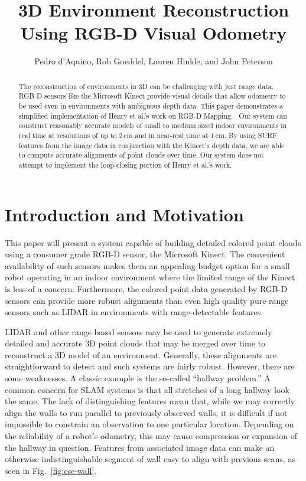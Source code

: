 \documentclass[letterpaper, 10pt, conference]{ieeeconf}
\title{\LARGE \bf
    3D Environment Reconstruction Using RGB-D Visual Odometry
}
\author{Pedro d'Aquino, Rob Goeddel, Lauren Hinkle, and John Peterson}
\begin{document}
\maketitle

\begin{abstract}
The reconstruction of environments in 3D can be challenging with just range
data. RGB-D sensors like the Microsoft Kinect provide visual details that
allow odometry to be used even in environments with ambiguous depth data.
This paper demonstrates a simplified implementation of Henry et al.'s work
on RGB-D Mapping.~\cite{Henry2010rgbd}
Our system can construct reasonably accurate models of
small to medium sized indoor environments in real time at resolutions of up
to 2\,cm and in near-real time at 1\,cm. By using SURF features from the image
data in conjunction with the Kinect's depth data, we are able to compute
accurate alignments of point clouds over time. Our system does not attempt to
implement the loop-closing portion of Henry et al.'s work.
\end{abstract}

\section{Introduction and Motivation}
This paper will present a system capable of building detailed colored point
clouds using a consumer grade RGB-D sensor, the Microsoft Kinect. The
convenient availability of such sensors makes them an appealing budget option
for a small robot operating in an indoor environment where the limited range
of the Kinect is less of a concern. Furthermore, the colored point data
generated by RGB-D sensors can provide more robust alignments than even high
quality pure-range sensors such as LIDAR in environments with range-detectable
features.

LIDAR and other range based sensors may be used to generate extremely detailed
and accurate 3D point clouds that may be merged over time to reconstruct a 3D
model of an environment. Generally, these alignments are straightforward to
detect and such systems are fairly robust. However, there are some weaknesses.
A classic example is the so-called ``hallway problem.'' A common concern for
SLAM systems is that all stretches of a long hallway look the same. The lack
of distinguishing features mean that, while we may correctly align the walls
to run parallel to previously observed walls, it is difficult if not
impossible to constrain an observation to one particular location. Depending
on the reliability of a robot's odometry, this may cause compression or
expansion of the hallway in question. Features from associated image data can
make an otherwise indistinguishable segment of wall easy to align with
previous scans, as seen in Fig.~\ref{fig:cse-wall}.
\end{document}
